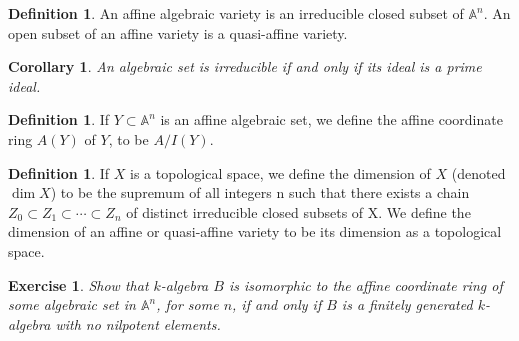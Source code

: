 \documentclass[11pt]{book}
\newtheorem{corollary}[theorem]{Corollary}
\newtheorem{exercise}{Exercise}[section]
\theoremstyle{definition}
\newtheorem{definition}[theorem]{Definition}
\numberwithin{equation}{section}
\begin{document}
\begin{defbox}
    \begin{definition}
        \label{def:algebraic_variety}
        An affine algebraic variety is an irreducible closed subset of \(\mathbb{A}^n\). An open subset of an affine variety is a quasi-affine variety.
    \end{definition}
\end{defbox}

\begin{thmbox}
\begin{corollary}
    \label{cor:ideal_correspondence}
    An algebraic set is irreducible if and only if its ideal is a prime ideal.
\end{corollary}
\end{thmbox}

\begin{defbox}
    \begin{definition}
        \label{def:affine_coordinate_ring}
        If \(Y \subset \mathbb{A}^n\) is an affine algebraic set, we define the affine coordinate ring \(A(Y)\) of \(Y\), to be \(A / I(Y)\). 
    \end{definition}
\end{defbox}

\begin{defbox}
    \begin{definition}
        \label{def:dimension_topological_space}
        If \(X\) is a topological space, we define the dimension of \(X\) (denoted
        \(\dim  X\)) to be the supremum of all integers n such that there exists a chain \(Z_0 \subset Z_1 \subset \cdots \subset Z_n\) of distinct irreducible closed subsets of X. We define the dimension of an affine or quasi-affine variety to be its dimension as a topological space. 
    \end{definition}
\end{defbox}

% 

\begin{exercise}
Show that \(k\)-algebra \(B\) is isomorphic to the affine coordinate ring of some algebraic set in \(\mathbb{A}^n\), for some \(n\), if and only if \(B\) is a finitely generated \(k\)-algebra with no nilpotent elements.
\end{exercise}

\printbibliography
\end{document}
